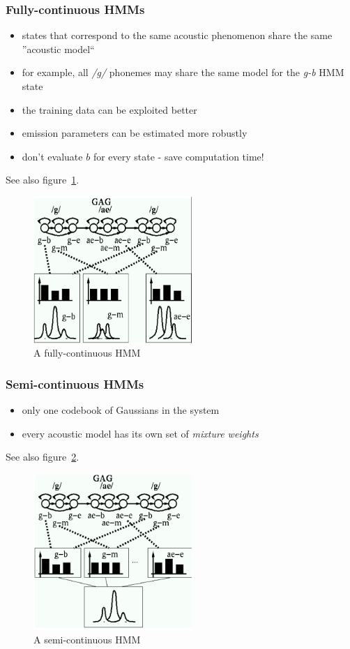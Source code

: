 \subsubsection{Fully-continuous HMMs}
\begin{itemize}
    \item states that correspond to the same acoustic phenomenon share the same ''acoustic model``
    \item for example, all \textit{/g/} phonemes may share the same model for the \textit{g-b} HMM state
    \item the training data can be exploited better
    \item emission parameters can be estimated more robustly
    \item don't evaluate $b$ for every state - save computation time!
\end{itemize}
See also figure~\ref{fig:fullyContinuousHMMs}.
\begin{figure}[ht]
\centering
\includegraphics[width=6cm]{images/fully.png}
\caption{A fully-continuous HMM}
\label{fig:fullyContinuousHMMs}
\end{figure}

\subsubsection{Semi-continuous HMMs}
\begin{itemize}
    \item only one codebook of Gaussians in the system
    \item every acoustic model has its own set of \textit{mixture weights}
\end{itemize}
See also figure~\ref{fig:semiContinuousHMMs}.
\begin{figure}[ht]
\centering
\includegraphics[width=6cm]{images/semi.png}
\caption{A semi-continuous HMM}
\label{fig:semiContinuousHMMs}
\end{figure}

